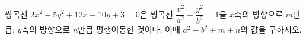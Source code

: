 쌍곡선 $2x^2-5y^2+12x+10y+3=0$은 쌍곡선 $\dfrac{x^2}{a^2}-\dfrac{y^2}{b^2}=1$을 $x$축의 방향으로 $m$만큼, $y$축의 방향으로 $n$만큼 평행이동한 것이다. 이때 $a^2+b^2+m+n$의 값을 구하시오. 
